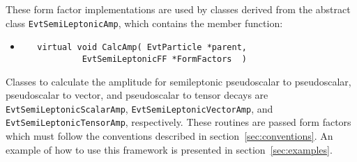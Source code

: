\documentclass[6pt]{article}
\begin{document}
\noindent These form factor implementations are used by classes
derived from the abstract class {\tt EvtSemiLeptonicAmp},
which contains the member function:
\begin{itemize}
\item \begin{verbatim}   virtual void CalcAmp( EvtParticle *parent,
            EvtSemiLeptonicFF *FormFactors  ) 
\end{verbatim}
\end{itemize}
Classes to calculate the amplitude for semileptonic pseudoscalar to
pseudoscalar, pseudoscalar to vector, and 
pseudoscalar to tensor decays are 
{\tt EvtSemiLeptonicScalarAmp},
{\tt EvtSemiLeptonicVectorAmp}, and
{\tt EvtSemiLeptonicTensorAmp}, 
respectively.  These routines are passed form factors which
must follow the conventions described in section~\ref{sec:conventions}.
An example of how to use this framework is presented in 
section~\ref{sec:examples}.
 
\end{document}
